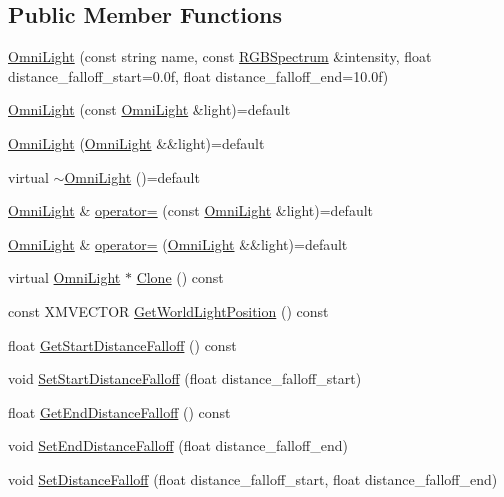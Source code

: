 \subsection*{Public Member Functions}
\begin{DoxyCompactItemize}
\item 
\hyperlink{classmage_1_1_omni_light_a245aeb25833cbc86cb75909432b60edc}{Omni\+Light} (const string name, const \hyperlink{structmage_1_1_r_g_b_spectrum}{R\+G\+B\+Spectrum} \&intensity, float distance\+\_\+falloff\+\_\+start=0.\+0f, float distance\+\_\+falloff\+\_\+end=10.\+0f)
\item 
\hyperlink{classmage_1_1_omni_light_a090be5e95e1c3d6c43e80ad7fae10794}{Omni\+Light} (const \hyperlink{classmage_1_1_omni_light}{Omni\+Light} \&light)=default
\item 
\hyperlink{classmage_1_1_omni_light_ae844308b4199f9c75c38512e8d8ad5e7}{Omni\+Light} (\hyperlink{classmage_1_1_omni_light}{Omni\+Light} \&\&light)=default
\item 
virtual \hyperlink{classmage_1_1_omni_light_a9a741cc7e5e11d386c7a032df2d231a3}{$\sim$\+Omni\+Light} ()=default
\item 
\hyperlink{classmage_1_1_omni_light}{Omni\+Light} \& \hyperlink{classmage_1_1_omni_light_a229f887994607b5b2813af223b0de302}{operator=} (const \hyperlink{classmage_1_1_omni_light}{Omni\+Light} \&light)=default
\item 
\hyperlink{classmage_1_1_omni_light}{Omni\+Light} \& \hyperlink{classmage_1_1_omni_light_ab753e7311449d30dac4dfee1f8498e92}{operator=} (\hyperlink{classmage_1_1_omni_light}{Omni\+Light} \&\&light)=default
\item 
virtual \hyperlink{classmage_1_1_omni_light}{Omni\+Light} $\ast$ \hyperlink{classmage_1_1_omni_light_a43f53b59b022ca6ab2d8b7646e644e15}{Clone} () const
\item 
const X\+M\+V\+E\+C\+T\+OR \hyperlink{classmage_1_1_omni_light_aac84b4cd5f3cc3b4cb162b03c8eddd8f}{Get\+World\+Light\+Position} () const
\item 
float \hyperlink{classmage_1_1_omni_light_ab37a3e3880f519f40f9c9eaa786ba769}{Get\+Start\+Distance\+Falloff} () const
\item 
void \hyperlink{classmage_1_1_omni_light_a1aa0708286f33343f1d0c86ff5929c05}{Set\+Start\+Distance\+Falloff} (float distance\+\_\+falloff\+\_\+start)
\item 
float \hyperlink{classmage_1_1_omni_light_ac3a8638331aa35ffd8967ccc78ca2df7}{Get\+End\+Distance\+Falloff} () const
\item 
void \hyperlink{classmage_1_1_omni_light_a620747a69ab6cc7b3801da76b6d2bef4}{Set\+End\+Distance\+Falloff} (float distance\+\_\+falloff\+\_\+end)
\item 
void \hyperlink{classmage_1_1_omni_light_af42a66c4ded3ec270c05f2114c2565fa}{Set\+Distance\+Falloff} (float distance\+\_\+falloff\+\_\+start, float distance\+\_\+falloff\+\_\+end)
\end{DoxyCompactItemize}
